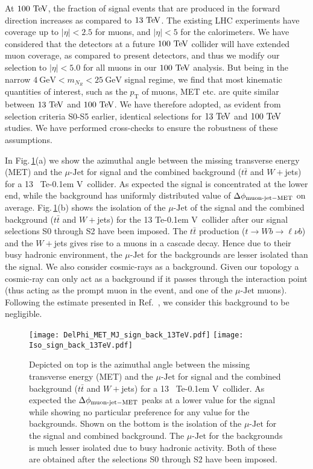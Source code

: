 \documentclass[reprint,doublecolumn,secnumarabic,amssymb, amsmath, aps,nofootinbib,superscriptaddress]{revtex4-1}
\newcommand{\Fig}[1]{Fig.\,\ref{#1}}
\def\TeV{\ifmmode {\mathrm{\ Te\kern -0.1em V}}\else
                   \textrm{Te\kern -0.1em V}\fi}%
\newcommand{\pt}      {\ensuremath{p_{\mathrm{T}}}}
\def\abseta{\ensuremath{|\eta|}}
\newcommand{\gev}{~\text{GeV}}
\newcommand{\ttbar}{\ensuremath{t\bar{t}}}
\begin{document}
At $100\TeV$, the fraction of signal events that are produced in the forward direction increases as compared to $13\TeV$. The existing LHC experiments have coverage up to $\abseta<2.5$ for muons, and $\abseta<5$ for the calorimeters. We have considered that the detectors at a future $100\TeV$ collider will have extended muon coverage, as compared to present detectors, and thus we modify our selection to $\abseta<5.0$ for all muons in our $100\TeV$ analysis. But being in the narrow $4\gev <m_{N_R}<25\gev$ signal regime, we find that most kinematic quantities of interest, such as the $\pt$ of muons, MET etc. are quite similar between $13\TeV$ and $100\TeV$. We have therefore adopted, as evident from selection criteria S0-S5 earlier, identical selections for $13\TeV$  and $100\TeV$ studies. We have performed cross-checks to ensure the robustness of these assumptions.	
	
In \Fig{13TeV_MET}(a) we show the azimuthal angle between the missing transverse energy (MET) and the $\mu\text{-Jet}$ for signal and the combined background ($\ttbar$ and $W+$jets) for a 13~\TeV\ collider. As expected the signal is concentrated at the lower end,
while the background has uniformly distributed value of $\Delta \phi_{\rm{\text{muon-jet}}-\rm{MET}}$ on average. \Fig{13TeV_MET}(b) shows the isolation of the $\mu\text{-Jet}$ of the signal and the combined background ($\ttbar$ and $W+$jets) for the 13 \TeV\ collider after our signal selections S0 through S2 have been imposed. The $\ttbar$ production ($t\rightarrow Wb\rightarrow \ell\nu b$) and the $W+$jets gives rise to a muons in a cascade decay. Hence due to their busy hadronic environment, the $\mu\text{-Jet}$ for the backgrounds are lesser isolated than the signal. We also consider cosmic-rays as a background. Given our topology a cosmic-ray can only act as a background if it passes through the interaction point (thus acting as the prompt muon in the event, and one of the $\mu\text{-Jet}$
muons). Following the estimate presented in  Ref.~\cite{Izaguirre:2015pga}, we consider this background to be negligible.


\begin{figure}
  \centering
   \texttt{[image: DelPhi\_MET\_MJ\_sign\_back\_13TeV.pdf]}
   \texttt{[image: Iso\_sign\_back\_13TeV.pdf]}
  \caption{Depicted on top is the azimuthal angle between the missing transverse energy (MET) and the $\mu\text{-Jet}$ for signal and the combined background ($\ttbar$ and $W+$jets) for a 13~\TeV\ collider. As expected the $\Delta \phi_{\rm{\text{muon-jet}}-\rm{MET}}$ peaks at a lower value for the signal while showing no particular preference for any value for the backgrounds. Shown on the bottom is the isolation of the $\mu\text{-Jet}$ for the signal and combined background. The $\mu\text{-Jet}$ for the backgrounds is much lesser isolated due to busy hadronic activity. Both of these are obtained after the selections S0 through S2 have been imposed.}
  \label{13TeV_MET}
\end{figure}		 		
\end{document}
